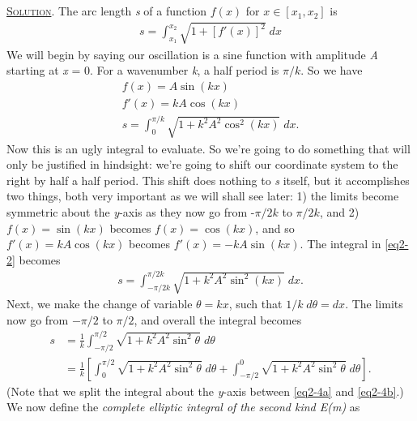 \documentclass[11pt]{article}
\begin{document}
\subsection[Solution]{} \textsc{\underline{Solution}}. The arc length \textit{s} of a function $f(x)$ for $x \in [x_1, x_2]$ is
\begin{align} \label{eq2-1}
s = \int_{x_1}^{x_2} \sqrt{1 + [f'(x)]^2} \; dx
\end{align}
We will begin by saying our oscillation is a sine function with amplitude \textit{A} starting at \textit{x} = 0. For a wavenumber \textit{k}, a half period is $\pi / k$. So we have
\begin{gather}
f(x) = A\sin{(kx)} \nonumber \\
f'(x) = kA\cos{(kx)} \nonumber \\
s = \int_{0}^{\pi / k} \sqrt{1 + k^2 A^2 \cos^2 (kx)} \; dx. \label{eq2-2}
\end{gather}
Now this is an ugly integral to evaluate. So we're going to do something that will only be justified in hindsight: we're going to shift our coordinate system to the right by half a half period. This shift does nothing to \textit{s} itself, but it accomplishes two things, both very important as we will shall see later: 1) the limits become symmetric about the \textit{y}-axis as they now go from -$\pi/2k$ to $\pi/2k$, and 2) $f(x)= \sin (kx)$ becomes $f(x) = \cos (kx)$, and so $f'(x) = kA \cos(kx)$ becomes $f'(x) = -kA \sin(kx)$. The integral in \eqref{eq2-2} becomes
\begin{align}
s = \int_{-\pi/2k}^{\pi / 2k} \sqrt{1 + k^2 A^2 \sin^2 (kx)} \; dx. \label{eq2-3}
\end{align}
Next, we make the change of variable $\theta = kx$, such that $1/k \; d\theta = dx$. The limits now go from $-\pi/2$ to $\pi/2$, and overall the integral becomes
\begin{subequations}
\begin{align}
s &= \frac{1}{k}\int_{-\pi/2}^{\pi / 2} \sqrt{1 + k^2 A^2 \sin^2 \theta} \; d\theta \label{eq2-4a} \\
&= \frac{1}{k}\left[ \int_{0}^{\pi/2} \sqrt{1+k^2 A^2 \sin^2 \theta} \; d\theta + \int^{0}_{-\pi/2} \sqrt{1+k^2 A^2 \sin^2 \theta}  \; d\theta \right]. \label{eq2-4b}
\end{align}
\end{subequations}
(Note that we split the integral about the \textit{y}-axis between \eqref{eq2-4a} and \eqref{eq2-4b}.) We now define the \textit{complete elliptic integral of the second kind E(m)} as
\end{document}
